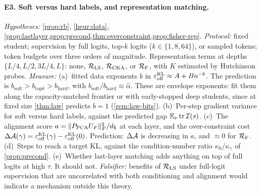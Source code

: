 \paragraph{E3. Soft versus hard labels, and representation matching.}
\emph{Hypotheses:} \cref{prop:rb}, \cref{heur:data}, \cref{prop:lastlayer,prop:precond,thm:overconstraint,prop:fisher-rep}.
\emph{Protocol:} fixed student; supervision by full logits, top-$k$ logits ($k\in\{1,8,64\}$), or sampled tokens;
token budgets over three orders of magnitude. Representation terms at depths $\{L/4,L/2,3L/4,L\}$: none,
$\mathcal{R}_{\mathrm{LS}}$, $\mathcal{R}_{\mathrm{CKA}}$, or $\mathcal{R}_{\mathrm F}$, with $K$ estimated by Hutchinson probes.
\emph{Measure:} (a)~fitted data exponents $b$ in $\varepsilon_{\mathrm{off}}^{\mathrm{KL}}\approx A+Bn^{-b}$. The prediction is
$b_{\mathrm{soft}}>b_{\mathrm{top}k}>b_{\mathrm{hard}}$, with $b_{\mathrm{soft}}/b_{\mathrm{hard}}\approx\hat\alpha$. These are envelope exponents: fit them along the
capacity-matched frontier or with early-stopped deep students, since at fixed size \cref{thm:law} predicts $b=1$
(\cref{rem:law-bits}).
(b)~Per-step gradient variance for soft versus hard labels, against the predicted gap $\mathbb{E}_\nu\operatorname{tr}\mathcal I(s)$.
(c)~The alignment score $a=\|P_{\mathrm{PCA}}U_F\|_F^2/d_{\mathsf{S}}$ at each layer, and the over-constraint cost
$\Delta\mathcal{A}(\gamma)=\varepsilon_{\mathrm{off}}^{\mathrm{KL}}(\gamma)-\varepsilon_{\mathrm{off}}^{\mathrm{KL}}(0)$. Prediction: $\Delta\mathcal{A}$ is decreasing in $a$, and $\approx0$ for $\mathcal{R}_{\mathrm F}$.
(d)~Steps to reach a target KL, against the condition-number ratio $\kappa_0/\kappa_\gamma$ of \cref{prop:precond}.
(e)~Whether last-layer matching adds anything on top of full logits at high $\tau$. It should not.
\emph{Falsifier:} benefits of $\mathcal{R}_{\mathrm{LS}}$ under full-logit supervision that are uncorrelated with both
conditioning and alignment would indicate a mechanism outside this theory.
